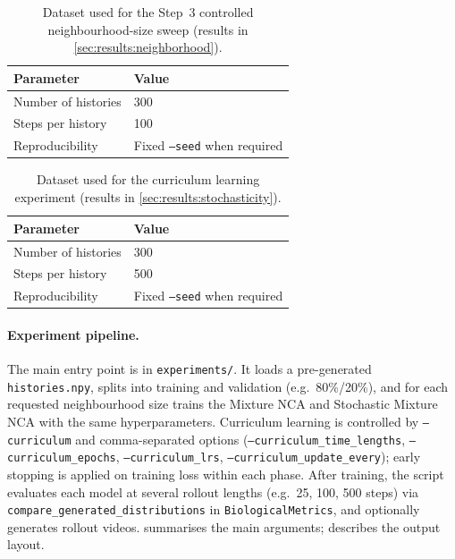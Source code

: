 \begin{table}[htbp]
  \centering
  \caption{Dataset used for the Step~3 controlled neighbourhood-size sweep (results in \cref{sec:results:neighborhood}).}
  \label{tab:tools:dataset}
  \begin{tabular}{@{}ll@{}}
    \hline
    \textbf{Parameter} & \textbf{Value} \\
    \hline
    Number of histories & 300 \\
    Steps per history & 100 \\
    Reproducibility & Fixed \texttt{--seed} when required \\
    \hline
  \end{tabular}
\end{table}

\begin{table}[htbp]
  \centering
  \caption{Dataset used for the curriculum learning experiment (results in \cref{sec:results:stochasticity}).}
  \label{tab:tools:dataset_curriculum}
  \begin{tabular}{@{}ll@{}}
    \hline
    \textbf{Parameter} & \textbf{Value} \\
    \hline
    Number of histories & 300 \\
    Steps per history & 500 \\
    Reproducibility & Fixed \texttt{--seed} when required \\
    \hline
  \end{tabular}
\end{table}

\paragraph{Experiment pipeline.}
The main entry point is in \texttt{experiments/}.
It loads a pre-generated \texttt{histories.npy}, splits into training and validation (e.g.\ 80\%/20\%), and for each requested neighbourhood size trains the Mixture NCA and Stochastic Mixture NCA with the same hyperparameters.
Curriculum learning is controlled by \texttt{--curriculum} and comma-separated options (\texttt{--curriculum\_time\_lengths}, \texttt{--curriculum\_epochs}, \texttt{--curriculum\_lrs}, \texttt{--curriculum\_update\_every}); early stopping is applied on training loss within each phase.
After training, the script evaluates each model at several rollout lengths (e.g.\ 25, 100, 500 steps) via \texttt{compare\_generated\_distributions} in \texttt{BiologicalMetrics}, and optionally generates rollout videos.
 summarises the main arguments;  describes the output layout.

